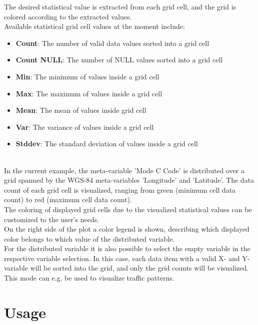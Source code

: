 The desired statistical value is extracted from each grid cell, and the grid is colored according to the extracted values. \\

Available statistical grid cell values at the moment include:

\begin{itemize}
    \item \textbf{Count}: The number of valid data values sorted into a grid cell
    \item \textbf{Count NULL}: The number of NULL values sorted into a grid cell
    \item \textbf{Min}: The minimum of values inside a grid cell
    \item \textbf{Max}: The maximum of values inside a grid cell
    \item \textbf{Mean}: The mean of values inside grid cell
    \item \textbf{Var}: The variance of values inside a grid cell
    \item \textbf{Stddev}: The standard deviation of values inside a grid cell
\end{itemize}
\ \\

In the current example, the meta-variable 'Mode C Code' is distributed over a grid spanned by the WGS-84 meta-variables 'Longitude' and 'Latitude'.
The data count of each grid cell is visualized, ranging from green (minimum cell data count) to red (maximum cell data count). \\

The coloring of displayed grid cells due to the visualized statistical values can be customized to the user's needs. \\

On the right side of the plot a color legend is shown, describing which displayed color belongs to which value of the distributed variable. \\

For the distributed variable it is also possible to select the empty variable in the respective variable selection. 
In this case, each data item with a valid X- and Y-variable will be sorted into the grid, 
and only the grid counts will be visualized. This mode can e.g. be used to visualize traffic patterns.

\section{Usage}

